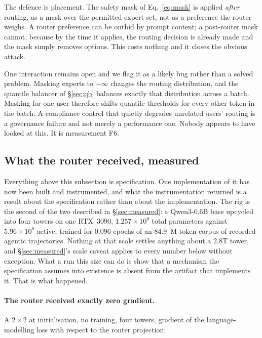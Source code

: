 \documentclass[11pt]{article}
\begin{document}
The defence is placement. The safety mask of Eq.~\eqref{eq:mask} is applied \emph{after} routing, as a mask over the permitted expert set, not as a preference the router weighs. A router preference can be outbid by prompt content; a post-router mask cannot, because by the time it applies, the routing decision is already made and the mask simply removes options. This costs nothing and it closes the obvious attack.

One interaction remains open and we flag it as a likely bug rather than a solved problem. Masking experts to $-\infty$ changes the routing distribution, and the quantile balancer of \S\ref{sec:qb} balances exactly that distribution across a batch. Masking for one user therefore shifts quantile thresholds for every other token in the batch. A compliance control that quietly degrades unrelated users' routing is a governance failure and not merely a performance one. Nobody appears to have looked at this. It is measurement F6.

\subsection{What the router received, measured}
\label{sec:routergrad}

Everything above this subsection is specification. One implementation of it has now been built and instrumented, and what the instrumentation returned is a result about the specification rather than about the implementation. The rig is the second of the two described in \S\ref{sec:measured}: a Qwen3-0.6B base upcycled into four towers on one RTX~3090, $1.257\times10^{9}$ total parameters against $5.96\times10^{8}$ active, trained for $0.096$ epochs of an $84.9$~M-token corpus of recorded agentic trajectories. Nothing at that scale settles anything about a 2.8T tower, and \S\ref{sec:measured}'s scale caveat applies to every number below without exception. What a run this size can do is show that a mechanism the specification assumes into existence is absent from the artifact that implements it. That is what happened.

\paragraph{The router received exactly zero gradient.} A $2\times2$ at initialisation, no training, four towers, gradient of the language-modelling loss with respect to the router projection:
\end{document}
